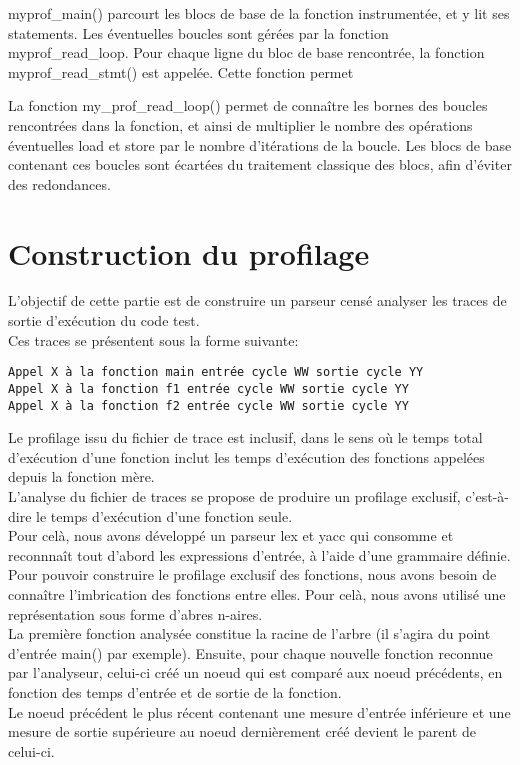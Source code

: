 \documentclass[oneside,11pt]{article}
\begin{document}
myprof\_main() parcourt les blocs de base de la fonction instrumentée, et y lit ses statements. Les éventuelles boucles sont gérées par la fonction myprof\_read\_loop.
Pour chaque ligne du bloc de base rencontrée, la fonction myprof\_read\_stmt() est appelée. Cette fonction permet 

La fonction my\_prof\_read\_loop() permet de connaître les bornes des boucles rencontrées dans la fonction, et ainsi de multiplier le nombre des opérations éventuelles load et store par le nombre d'itérations de la boucle. Les blocs de base contenant ces boucles sont écartées du traitement classique des blocs, afin d'éviter des redondances.

\section{Construction du profilage}

L'objectif de cette partie est de construire un parseur censé analyser les traces de sortie d'exécution du code test.\\

Ces traces se présentent sous la forme suivante:
\begin{verbatim}
Appel X à la fonction main entrée cycle WW sortie cycle YY
Appel X à la fonction f1 entrée cycle WW sortie cycle YY
Appel X à la fonction f2 entrée cycle WW sortie cycle YY
\end{verbatim}

Le profilage issu du fichier de trace est inclusif, dans le sens où le temps total d'exécution d'une fonction inclut les temps d'exécution des fonctions appelées depuis la fonction mère.\\
L'analyse du fichier de traces se propose de produire un profilage exclusif, c'est-à-dire le temps d'exécution d'une fonction seule.\\
Pour celà, nous avons développé un parseur lex et yacc qui consomme et reconnnaît tout d'abord les expressions d'entrée, à l'aide d'une grammaire définie.\\

Pour pouvoir construire le profilage exclusif des fonctions, nous avons besoin de connaître l'imbrication des fonctions entre elles.
Pour celà, nous avons utilisé une représentation sous forme d'abres n-aires.\\
La première fonction analysée constitue la racine de l'arbre (il s'agira du point d'entrée main() par exemple). Ensuite, pour chaque nouvelle fonction reconnue par l'analyseur, celui-ci créé un noeud qui est comparé aux noeud précédents, en fonction des temps d'entrée et de sortie de la fonction.\\
Le noeud précédent le plus récent contenant une mesure d'entrée inférieure et une mesure de sortie supérieure au noeud dernièrement créé devient le parent de celui-ci.\\
\end{document}

